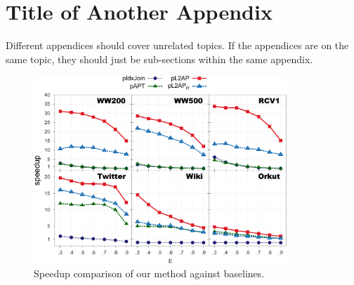 \chapter{Title of Another Appendix}\label{apx:appendix2}

Different appendices should cover unrelated topics. If the appendices are on the same topic, they should just be sub-sections within the same appendix. 

\begin{figure}[tbh]
  \centering
  \includegraphics[width=0.85\textwidth]{img/speedup2-nbase.pdf}
  \caption{Speedup comparison of our method against baselines.}
  \label{fig:speedup}
\end{figure}